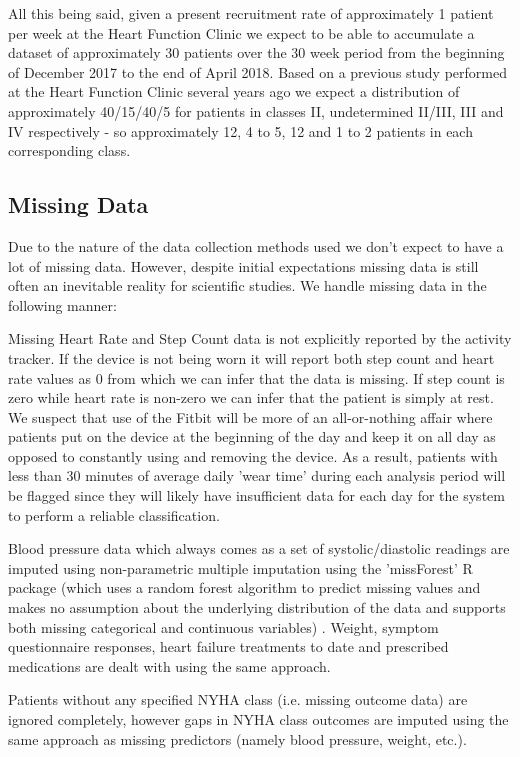 \documentclass[]{article}
\begin{document}
All this being said, given a present recruitment rate of approximately 1 patient per week at the Heart Function Clinic we expect to be able to accumulate a dataset of approximately 30 patients over the 30 week period from the beginning of December 2017 to the end of April 2018. Based on a previous study performed at the Heart Function Clinic several years ago we expect a distribution of approximately 40/15/40/5 for patients in classes II, undetermined II/III, III and IV respectively - so approximately 12, 4 to 5, 12 and 1 to 2 patients in each corresponding class\cite{Seto2010}.

\subsection{Missing Data} %

Due to the nature of the data collection methods used we don't expect to have a lot of missing data. However, despite initial expectations missing data is still often an inevitable reality for scientific studies. We handle missing data in the following manner:

Missing Heart Rate and Step Count data is not explicitly reported by the activity tracker. If the device is not being worn it will report both step count and heart rate values as 0 from which we can infer that the data is missing. If step count is zero while heart rate is non-zero we can infer that the patient is simply at rest. We suspect that use of the Fitbit will be more of an all-or-nothing affair where patients put on the device at the beginning of the day and keep it on all day as opposed to constantly using and removing the device. As a result, patients with less than 30 minutes of average daily 'wear time' during each analysis period will be flagged since they will likely have insufficient data for each day for the system to perform a reliable classification. 

Blood pressure data which always comes as a set of systolic/diastolic readings are imputed using non-parametric multiple imputation using the 'missForest' R package (which uses a random forest algorithm to predict missing values and makes no assumption about the underlying distribution of the data and supports both missing categorical and continuous variables) \cite{AnalyticsVidhyaContentTeam2016,Stekhoven2016}. Weight, symptom questionnaire responses, heart failure treatments to date and prescribed medications are dealt with using the same approach.

Patients without any specified NYHA class (i.e. missing outcome data) are ignored completely, however gaps in NYHA class outcomes are imputed using the same approach as missing predictors (namely blood pressure, weight, etc.).
\end{document}
